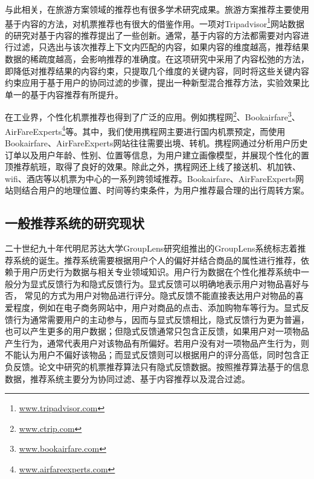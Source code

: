 与此相关，在旅游方案领域的推荐也有很多学术研究成果。旅游方案推荐主要使用基于内容的方法，对机票推荐也有很大的借鉴作用。一项对Tripadvisor\footnote{\url{www.tripadvisor.com}}网站数据的研究对基于内容的推荐提出了一些创新。通常，基于内容的方法都需要对内容进行过滤，只选出与该次推荐上下文内匹配的内容，如果内容的维度越高，推荐结果数据的稀疏度越高，会影响推荐的准确度。在这项研究中采用了内容松弛的方法，即降低对推荐结果的内容约束，只提取几个维度的关键内容，同时将这些关键内容约束应用于基于用户的协同过滤的步骤，提出一种新型混合推荐方法，实验效果比单一的基于内容推荐有所提升。

在工业界，个性化机票推荐也得到了广泛的应用。例如携程网\footnote{\url{www.ctrip.com}}、Bookairfare\footnote{\url{www.bookairfare.com}}、AirFareExperts\footnote{\url{www.airfareexperts.com}}等。其中，我们使用携程网主要进行国内机票预定，而使用Bookairfare、AirFareExperts网站往往需要出境、转机。携程网通过分析用户历史订单以及用户年龄、性别、位置等信息，为用户建立画像模型，并展现个性化的置顶推荐航班，取得了良好的效果。除此之外，携程网还上线了接送机、机加铁、wifi、酒店等以机票为中心的一系列跨领域推荐。Bookairfare、AirFareExperts网站则结合用户的地理位置、时间等约束条件，为用户推荐最合理的出行周转方案。

\subsection{一般推荐系统的研究现状}

二十世纪九十年代明尼苏达大学GroupLens研究组推出的GroupLens系统\parencite{konstan1997grouplens}标志着推荐系统的诞生。推荐系统需要根据用户个人的偏好并结合商品的属性进行推荐，依赖于用户历史行为数据与相关专业领域知识。用户行为数据在个性化推荐系统中一般分为显式反馈行为和隐式反馈行为\parencite{oard1998implicit,lin2001characterized}。显式反馈可以明确地表示用户对物品喜好与否，
常见的方式为用户对物品进行评分。隐式反馈不能直接表达用户对物品的喜爱程度，例如在电子商务网站中，用户对商品的点击、添加购物车等行为。显式反馈行为通常需要用户的主动参与，因而与显式反馈相比，隐式反馈行为更为普遍，也可以产生更多的用户数据；但隐式反馈通常只包含正反馈，如果用户对一项物品产生行为，通常代表用户对该物品有所偏好。若用户没有对一项物品产生行为，则不能认为用户不偏好该物品；而显式反馈则可以根据用户的评分高低，同时包含正负反馈。论文中研究的机票推荐算法只有隐式反馈数据。按照推荐算法基于的信息数据，推荐系统主要分为协同过滤\parencite{breese1998empirical}、基于内容推荐\parencite{pazzani1999framework,claypool1999combining}以及混合过滤\parencite{soboroff1999combining}。
		

